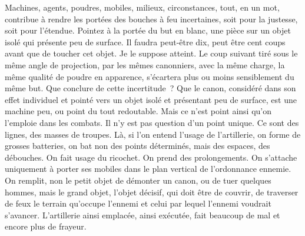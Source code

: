 \documentclass[french,twoside]{book} %
\begin{document}
Machines, agents, poudres, mobiles, milieux, circonstances, tout, en un mot, contribue à rendre les portées des bouches à feu incertaines, soit pour la justesse, soit pour l’étendue. Pointez à la portée du but en blanc, une pièce sur un objet isolé qui présente peu de surface. Il faudra peut-être dix, peut être cent coups avant que de toucher cet objet. Je le suppose atteint. Le coup suivant tiré sous le même angle de projection, par les mêmes canonniers, avec la même charge, la même qualité de poudre en apparence, s’écartera plus ou moins sensiblement du même but. Que conclure de cette incertitude ? Que le canon, considéré dans son effet individuel et pointé vers un objet isolé et présentant peu de surface, est une machine peu, ou point du tout redoutable. Mais ce n’est point ainsi qu’on l’emploie dans les combats. Il n’y est pas question d’un point unique. Ce sont des lignes, des masses de troupes. Là, si l’on entend l’usage de l’artillerie, on forme de grosses batteries, on bat non des points déterminés, mais des espaces, des débouches. On fait usage du ricochet. On prend des prolongements. On s’attache uniquement à porter ses mobiles dans le plan vertical de l’ordonnance ennemie. On remplit, non le petit objet de démonter un canon, ou de tuer quelques hommes, mais le grand objet, l’objet décisif, qui doit être de couvrir, de traverser de feux le terrain qu’occupe l’ennemi et celui par lequel l’ennemi voudrait s’avancer. L’artillerie ainsi emplacée, ainsi exécutée, fait beaucoup de mal et encore plus de frayeur.\par
\end{document}
